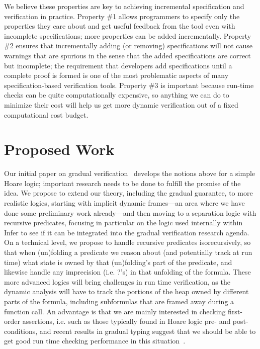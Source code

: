 \documentclass[10pt,twocolumn]{article}
\begin{document}
\begin{sloppypar}
\begin{enumerate}[leftmargin=1em]
\end{enumerate}

We believe these properties are key to achieving incremental specification and verification in practice.  Property \#1 allows programmers to specify only the properties they care about and get useful feedback from the tool even with incomplete specifications; more properties can be added incrementally.  Property \#2 ensures that incrementally adding (or removing) specifications will not cause warnings that are spurious in the sense that the added specifications are correct but incomplete; the requirement that developers add specifications until a complete proof is formed is one of the most problematic aspects of many specification-based verification tools.  Property \#3 is important because run-time checks can be quite computationally expensive, so anything we can do to minimize their cost will help us get more dynamic verification out of a fixed computational cost budget.


\section{Proposed Work}
\vspace{-2ex}

Our initial paper on gradual verification~\cite{baderAl:vmcai2018} develops the notions above for a simple Hoare logic; important research needs to be done to fulfill the promise of the idea.
We propose to extend our theory, including the gradual guarantee, to more realistic logics, starting with implicit dynamic frames---an area where we have done some preliminary work already---and then moving to a separation logic with recursive predicates, focusing in particular on the logic used internally within Infer to see if it can be integrated into the gradual verification research agenda.
On a technical level, we propose to handle recursive predicates isorecursively, so that when (un)folding a predicate we reason about (and potentially track at run time) what state is owned by that (un)folding's part of the predicate, and likewise handle any imprecision (i.e. ?'s) in that unfolding of the formula.
These more advanced logics will bring challenges in run time verification, as the dynamic analysis will have to track the portions of the heap owned by different parts of the formula, including subformulas that are framed away during a function call.
An advantage is that we are mainly interested in checking first-order assertions, i.e. such as those typically found in Hoare logic pre- and post-conditions, and recent results in gradual typing suggest that we should be able to get good run time checking performance in this situation~\cite{muehlboeckTate:oopsla2017}.


\end{sloppypar}
\end{document}
